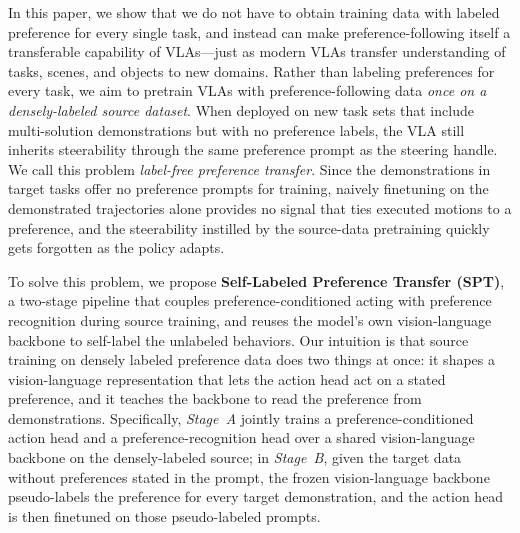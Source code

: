 \documentclass{article}
\begin{document}
In this paper, we show that we do not have to obtain training data with labeled preference for every single task, and instead can make preference-following itself a transferable capability of VLAs---just as modern VLAs transfer understanding of tasks, scenes, and objects to new domains.
Rather than labeling preferences for every task, we aim to pretrain VLAs with preference-following data \emph{once on a densely-labeled source dataset}.
When deployed on new task sets that include multi-solution demonstrations but with no preference labels, the VLA still inherits steerability through the same preference prompt as the steering handle.
We call this problem \emph{label-free preference transfer}.
Since the demonstrations in target tasks offer no preference prompts for training, naively finetuning on the demonstrated trajectories alone provides no signal that ties executed motions to a preference, and the steerability instilled by the source-data pretraining quickly gets forgotten as the policy adapts.


To solve this problem, we propose \textbf{Self-Labeled Preference Transfer (SPT)}, a two-stage pipeline that couples preference-conditioned acting with preference recognition during source training, and reuses the model's own vision-language backbone to self-label the unlabeled behaviors. Our intuition is that source training on densely labeled preference data does two things at once: it shapes a vision-language representation that lets the action head act on a stated preference, and it teaches the backbone to read the preference from demonstrations. Specifically, \emph{Stage~A} jointly trains a preference-conditioned action head and a preference-recognition head over a shared vision-language backbone on the densely-labeled source;
in \emph{Stage~B}, given the target data without preferences stated in the prompt, the frozen vision-language backbone pseudo-labels the preference for every target demonstration, and the action head is then finetuned on those pseudo-labeled prompts.
\end{document}
